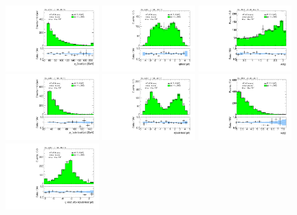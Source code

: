 \clearpage
\begin{figure}[tp]
  \includegraphics[width=0.32\textwidth]{figures/analysis/vbf-MCXSR/jet-1-pt}
  \includegraphics[width=0.32\textwidth]{figures/analysis/vbf-MCXSR/jet-1-eta}
  \includegraphics[width=0.32\textwidth]{figures/analysis/vbf-MCXSR/jets-dphi}
  \includegraphics[width=0.32\textwidth]{figures/analysis/vbf-MCXSR/jet-2-pt}
  \includegraphics[width=0.32\textwidth]{figures/analysis/vbf-MCXSR/jet-2-eta}
  \includegraphics[width=0.32\textwidth]{figures/analysis/vbf-MCXSR/jets-deta}
  \includegraphics[width=0.32\textwidth]{figures/analysis/vbf-MCXSR/jets-etaprod}

\end{figure}
